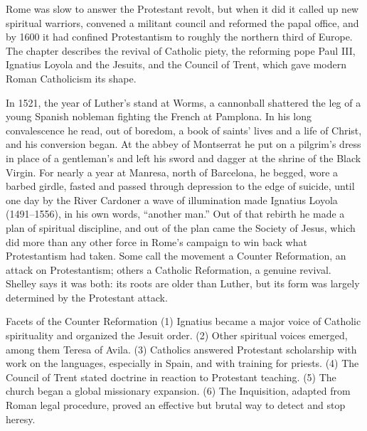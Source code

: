 
\begin{inbrief}
Rome was slow to answer the Protestant revolt, but when it did it called up new spiritual warriors,
convened a militant council and reformed the papal office, and by 1600 it had confined Protestantism
to roughly the northern third of Europe. The chapter describes the revival of Catholic piety, the
reforming pope Paul III, Ignatius Loyola and the Jesuits, and the Council of Trent, which gave modern
Roman Catholicism its shape.
\end{inbrief}

In 1521, the year of Luther's stand at Worms, a cannonball shattered the leg of a young Spanish
nobleman fighting the French at Pamplona. In his long convalescence he read, out of boredom, a book
of saints' lives and a life of Christ, and his conversion began. At the abbey of Montserrat he put on a pilgrim's dress in place of a gentleman's and left his sword and dagger at the shrine of the
Black Virgin. For nearly a year at Manresa, north of Barcelona, he begged, wore a barbed girdle,
fasted and passed through depression to the edge of suicide, until one day by the River Cardoner a
wave of illumination made Ignatius Loyola (1491--1556), in his own words, ``another man.'' Out of that
rebirth he made a plan of spiritual discipline, and out of the plan came the Society of Jesus, which did more than any other force in Rome's campaign to win back what Protestantism had taken. Some call the
movement a Counter Reformation, an attack on Protestantism; others a Catholic Reformation, a genuine
revival. Shelley says it was both: its roots are older than Luther, but its form was largely
determined by the Protestant attack.

\begin{sidebox}{Facets of the Counter Reformation}
(1) Ignatius became a major voice of Catholic spirituality and organized the Jesuit order. (2) Other
spiritual voices emerged, among them Teresa of Avila. (3) Catholics answered Protestant scholarship
with work on the languages, especially in Spain, and with training for priests. (4) The Council of
Trent stated doctrine in reaction to Protestant teaching. (5) The church began a global missionary
expansion. (6) The Inquisition, adapted from Roman legal procedure, proved an effective but brutal
way to detect and stop heresy.
\end{sidebox}

